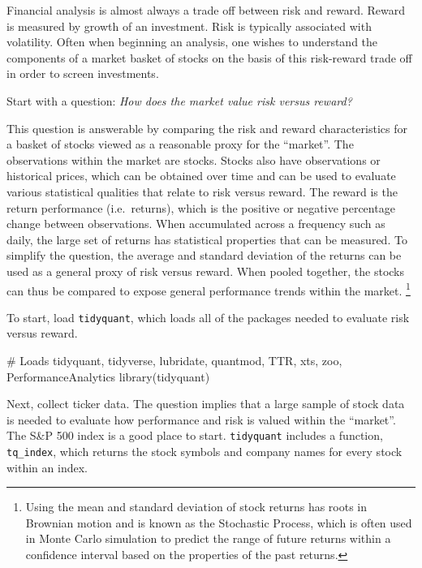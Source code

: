 Financial analysis is almost always a trade off between risk and reward.
Reward is measured by growth of an investment. Risk is typically
associated with volatility. Often when beginning an analysis, one wishes
to understand the components of a market basket of stocks on the basis
of this risk-reward trade off in order to screen investments.

Start with a question: \emph{How does the market value risk versus
reward?}

This question is answerable by comparing the risk and reward
characteristics for a basket of stocks viewed as a reasonable proxy for
the ``market''. The observations within the market are stocks. Stocks
also have observations or historical prices, which can be obtained over
time and can be used to evaluate various statistical qualities that
relate to risk versus reward. The reward is the return performance
(i.e.~returns), which is the positive or negative percentage change
between observations. When accumulated across a frequency such as daily,
the large set of returns has statistical properties that can be
measured. To simplify the question, the average and standard deviation
of the returns can be used as a general proxy of risk versus reward.
When pooled together, the stocks can thus be compared to expose general
performance trends within the market.
\footnote{Using the mean and standard deviation of stock returns has roots in Brownian motion and is known as the Stochastic Process, which is often used in Monte Carlo simulation to predict the range of future returns within a confidence interval based on the properties of the past returns. }

To start, load \texttt{tidyquant}, which loads all of the packages
needed to evaluate risk versus reward.

\begin{Schunk}
\begin{Sinput}
# Loads tidyquant, tidyverse, lubridate, quantmod, TTR, xts, zoo, PerformanceAnalytics
library(tidyquant)
\end{Sinput}
\end{Schunk}

Next, collect ticker data. The question implies that a large sample of
stock data is needed to evaluate how performance and risk is valued
within the ``market''. The S\&P 500 index is a good place to start.
\texttt{tidyquant} includes a function, \texttt{tq\_index}, which
returns the stock symbols and company names for every stock within an
index.

